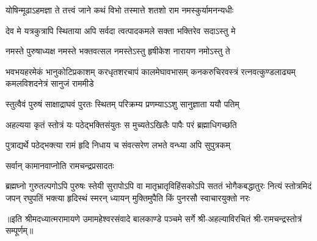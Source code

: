 \twolineshloka
{योषिन्मूढाऽहमज्ञा ते तत्त्वं जाने कथं विभो}
{तस्मात्ते शतशो राम नमस्कुर्यामनन्यधीः}%

\twolineshloka
{देव मे यत्रकुत्रापि स्थिताया अपि सर्वदा}
{त्वत्पादकमले सक्ता भक्तिरेव  सदाऽस्तु मे}%

\twolineshloka
{नमस्ते पुरुषाध्यक्ष नमस्ते भक्तवत्सल}
{नमस्तेऽस्तु हृषीकेश नारायण नमोऽस्तु ते}%

\fourlineindentedshloka
{भवभयहरमेकं भानुकोटिप्रकाशम्}
{करधृतशरचापं कालमेघावभासम्}
{कनकरुचिरवस्त्रं रत्नवत्कुण्डलाढ्यम्}
{कमलविशदनेत्रं सानुजं राममीडे}%

\twolineshloka
{स्तुत्वैवं पुरुषं साक्षाद्राघवं पुरतः स्थितम्}
{परिक्रम्य प्रणम्याऽऽशु सानुज्ञाता ययौ पतिम्}%

\twolineshloka
{अहल्यया कृतं स्तोत्रं यः पठेद्भक्तिसंयुतः}
{स मुच्यतेऽखिलैः पापैः परं ब्रह्माधिगच्छति}%

\twolineshloka
{पुत्राद्यर्थे पठेद्भक्त्या रामं हृदि निधाय च}
{संवत्सरेण लभते वन्ध्या अपि सुपुत्रकम्}%

\onelineshloka
{सर्वान् कामानवाप्नोति रामचन्द्रप्रसादतः}%

\fourlineindentedshloka
{ब्रह्मघ्नो गुरुतल्पगोऽपि पुरुषः स्तेयी सुरापोऽपि वा}
{मातृभ्रातृविहिंसकोऽपि सततं भोगैकबद्धातुरः}
{नित्यं स्तोत्रमिदं जपन्  रघुपतिं भक्त्या हृदिस्थं स्मरन्}
{ध्यायन् मुक्तिमुपैति किं पुनरसौ स्वाचारयुक्तो नरः}%

॥इति श्रीमदध्यात्मरामायणे उमामहेश्वरसंवादे बालकाण्डे
पञ्चमे  सर्गे श्री-अहल्याविरचितं श्री-रामचन्द्रस्तोत्रं सम्पूर्णम्॥
